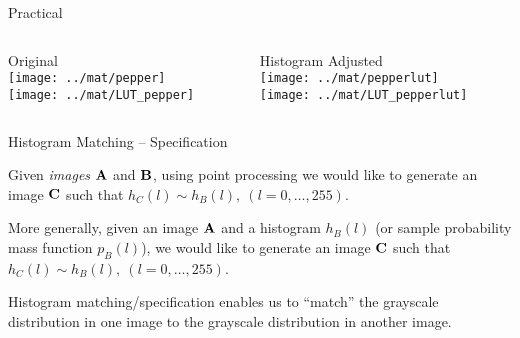 %
%
\begin{slide}{Practical}
\vspace{-3ex}
\begin{columns}
\begin{column}{0.45\textwidth}
\begin{center}
Original\\
\texttt{[image: ../mat/pepper]}\\
\texttt{[image: ../mat/LUT\_pepper]}
\end{center}
\end{column}
\begin{column}{0.45\textwidth}
\begin{center}
Histogram Adjusted\\
\texttt{[image: ../mat/pepperlut]}\\
\texttt{[image: ../mat/LUT\_pepperlut]}
\end{center}
\end{column}
\end{columns}
\end{slide}



%
%
\begin{slide}{Histogram Matching -- Specification}
\begin{titlelist}{}{}

\item<2-> 
Given {\em images} ${\bf A}$ and ${\bf B}$,
using point processing
we would like to generate an image 
${\bf C}$ 
such that $h_C(l)\sim h_B(l),\ (l=0,\ldots, 255)$.

\item<3-> 
More generally, given an image ${\bf A}$
and a histogram $h_B(l)$ {(or sample probability mass function
$p_B(l)$)}, we would like to generate an image 
${\bf C}$ such that $h_C(l)\sim h_B(l),\ (l=0,\ldots, 255)$.

\item<4-> 
Histogram matching/specification enables us
to ``match'' the grayscale distribution in one
image to  the grayscale distribution in another image.

\end{titlelist}
\end{slide}



